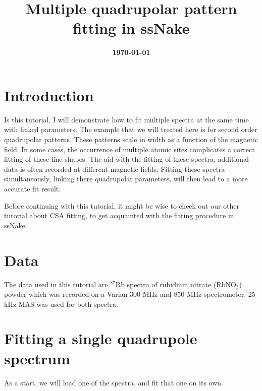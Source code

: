 \documentclass[11pt,a4paper]{article}
\title{\color{black}\fontfamily{SourceSansPro-LF}\bfseries Multiple quadrupolar pattern fitting in ssNake}
\author{}
\date{\color{black}\fontfamily{SourceSansPro-LF}\bfseries \today}
\begin{document}

\maketitle

\section{Introduction}
Is this tutorial, I will demonstrate how to fit multiple spectra at the same time with linked
parameters. The example that we will treated here is for second order quadrupolar patterns. These
patterns scale in width as a function of the magnetic field. In some cases, the occurrence of
multiple atomic sites complicates a correct fitting of these line shapes. The aid with the fitting
of these spectra, additional data is often recorded at different magnetic fields. Fitting these
spectra simultaneously, linking there quadrupolar parameters, will then lead to a more accurate
fit result.

Before continuing with this tutorial, it might be wise to check out our other tutorial about CSA
fitting, to get acquainted with the fitting procedure in ssNake.

\section{Data}
The data used in this tutorial are $^{87}$Rb spectra of rubidium nitrate (RbNO$_3$) powder which was recorded on a
Varian 300 MHz and 850 MHz spectrometer. 25 kHz MAS was used for both spectra.

\section{Fitting a single quadrupole spectrum}
As a start, we will load one of the spectra, and fit that one on its own.
\end{document}
